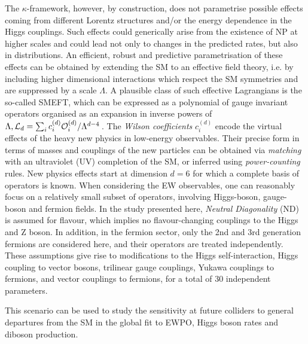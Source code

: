 \documentclass[../report.tex]{subfiles}
\newcommand{\commentsinout}[1]{#1}
\newcommand{\BH}[1]{\commentsinout{\textbf{\color{blue} [BH: #1]}}} %
\begin{document}
The $\kappa$-framework, however,  by construction, does not parametrise possible effects coming from different Lorentz structures and/or the energy dependence in the Higgs couplings. Such effects could generically arise from the existence of NP at higher scales and could lead not only to changes in the predicted rates, but also in distributions. An efficient, robust and predictive parametrisation of these effects can be obtained  by extending the SM to an effective field theory, i.e. by including higher dimensional interactions which respect the SM symmetries and are suppressed by a scale $\Lambda$. A plausible class of such effective Lagrangians is the so-called SMEFT, which can be expressed as a polynomial of gauge invariant operators 
 organised as an expansion in inverse powers of $\Lambda, {\cal L}_{d}= \sum_{i}  c_{i}^{(d)} {\cal O}_{i}^{(d)}/\Lambda^{d-4}\, $.
The {\em Wilson  coefficients} $c_i^{(d)}$ encode the virtual effects of the heavy new physics in low-energy observables. Their precise form in terms of masses and couplings of the new particles can be obtained via {\it matching} with an ultraviolet (UV) completion of the SM, or inferred using {\it power-counting} rules. New physics effects start at dimension $d=6$ for which  a complete basis of operators is known. When considering the EW observables,  one can reasonably focus on a relatively small subset of operators, involving Higgs-boson, gauge-boson and fermion fields.
In the study presented here, {\it Neutral Diagonality} (ND) is assumed for flavour, which implies no flavour-changing couplings to the Higgs and Z boson.
In addition, in the fermion sector, only the 2nd and 3rd generation fermions are considered here, and their operators are treated independently. These assumptions give rise to modifications to the Higgs self-interaction, Higgs coupling to vector bosons, trilinear gauge couplings, Yukawa couplings to fermions, and vector couplings to fermions, for a total of 30 independent parameters.  

This scenario can be used to study the sensitivity at future colliders to general departures from the SM in the global fit to EWPO, Higgs boson rates and diboson production.  
\end{document}
